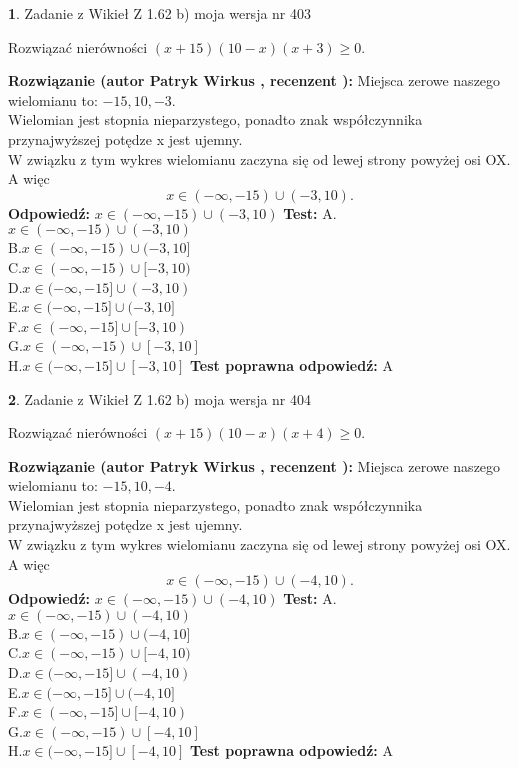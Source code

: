 \documentclass[12pt, a4paper]{article}
\theoremstyle{definition} %
\newtheorem{zad}{}
\newcommand{\zadStart}[1]{\begin{zad}#1\newline}
\newcommand{\zadStop}{\end{zad}}
\newcommand{\rozwStart}[2]{\noindent \textbf{Rozwiązanie (autor #1 , recenzent #2): }\newline}
\newcommand{\rozwStop}{\newline}
\newcommand{\odpStart}{\noindent \textbf{Odpowiedź:}\newline}
\newcommand{\odpStop}{\newline}
\newcommand{\testStart}{\noindent \textbf{Test:}\newline}
\newcommand{\testStop}{\newline}
\newcommand{\kluczStart}{\noindent \textbf{Test poprawna odpowiedź:}\newline}
\newcommand{\kluczStop}{\newline}
\begin{document}
\zadStart{Zadanie z Wikieł Z 1.62 b) moja wersja nr 403}

Rozwiązać nierówności $(x+15)(10-x)(x+3)\ge0$.
\zadStop
\rozwStart{Patryk Wirkus}{}
Miejsca zerowe naszego wielomianu to: $-15, 10, -3$.\\
Wielomian jest stopnia nieparzystego, ponadto znak współczynnika przy\linebreak najwyższej potędze x jest ujemny.\\ W związku z tym wykres wielomianu zaczyna się od lewej strony powyżej osi OX. A więc $$x \in (-\infty,-15) \cup (-3,10).$$
\rozwStop
\odpStart
$x \in (-\infty,-15) \cup (-3,10)$
\odpStop
\testStart
A.$x \in (-\infty,-15) \cup (-3,10)$\\
B.$x \in (-\infty,-15) \cup (-3,10]$\\
C.$x \in (-\infty,-15) \cup [-3,10)$\\
D.$x \in (-\infty,-15] \cup (-3,10)$\\
E.$x \in (-\infty,-15] \cup (-3,10]$\\
F.$x \in (-\infty,-15] \cup [-3,10)$\\
G.$x \in (-\infty,-15) \cup [-3,10]$\\
H.$x \in (-\infty,-15] \cup [-3,10]$
\testStop
\kluczStart
A
\kluczStop



\zadStart{Zadanie z Wikieł Z 1.62 b) moja wersja nr 404}

Rozwiązać nierówności $(x+15)(10-x)(x+4)\ge0$.
\zadStop
\rozwStart{Patryk Wirkus}{}
Miejsca zerowe naszego wielomianu to: $-15, 10, -4$.\\
Wielomian jest stopnia nieparzystego, ponadto znak współczynnika przy\linebreak najwyższej potędze x jest ujemny.\\ W związku z tym wykres wielomianu zaczyna się od lewej strony powyżej osi OX. A więc $$x \in (-\infty,-15) \cup (-4,10).$$
\rozwStop
\odpStart
$x \in (-\infty,-15) \cup (-4,10)$
\odpStop
\testStart
A.$x \in (-\infty,-15) \cup (-4,10)$\\
B.$x \in (-\infty,-15) \cup (-4,10]$\\
C.$x \in (-\infty,-15) \cup [-4,10)$\\
D.$x \in (-\infty,-15] \cup (-4,10)$\\
E.$x \in (-\infty,-15] \cup (-4,10]$\\
F.$x \in (-\infty,-15] \cup [-4,10)$\\
G.$x \in (-\infty,-15) \cup [-4,10]$\\
H.$x \in (-\infty,-15] \cup [-4,10]$
\testStop
\kluczStart
A
\kluczStop
\end{document}
